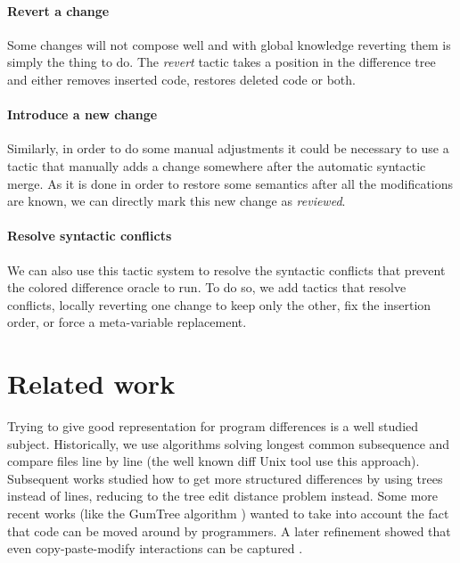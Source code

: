 \documentclass[a4paper,11pt]{article}
\begin{document}
\paragraph{Revert a change}
%
Some changes will not compose well and with global knowledge reverting
them is simply the thing to do. The \textit{revert} tactic takes a
position in the difference tree and either removes inserted code,
restores deleted code or both.

\paragraph{Introduce a new change}
%
Similarly, in order to do some manual adjustments it could be
necessary to use a tactic that manually adds a change somewhere after
the automatic syntactic merge. As it is done in order to restore some
semantics after all the modifications are known, we can directly mark
this new change as \textit{reviewed}.

\paragraph{Resolve syntactic conflicts}
%
We can also use this tactic system to resolve the syntactic conflicts
that prevent the colored difference oracle to run. To do so, we add
tactics that resolve conflicts, locally reverting one change to keep
only the other, fix the insertion order, or force a meta-variable
replacement.

\section{Related work}
\label{sec:related-work}
Trying to give good representation for program differences is a well studied subject. Historically, we use algorithms solving longest common subsequence \cite{wagner1974string} and compare files line by line (the well known diff Unix tool \cite{hunt1976algorithm} use this approach).
Subsequent works studied how to get more structured differences by using trees instead of lines, reducing to the tree edit distance problem \cite{bille2005survey} instead.
Some more recent works (like the GumTree algorithm \cite{falleri2014fine}) wanted to take into account the fact that code can be moved around by programmers. A later refinement showed that even copy-paste-modify interactions can be captured \cite{higo2017generating}.
\end{document}
